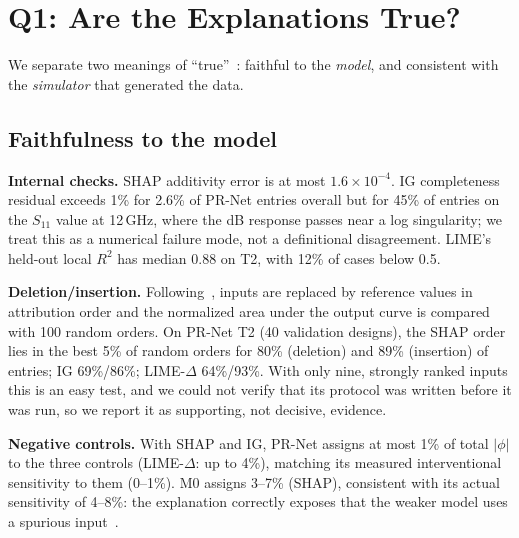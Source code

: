 \documentclass[conference,onecolumn,10pt]{IEEEtran}
\newcommand{\lime}{LIME-$\Delta$}
\begin{document}
\section{Q1: Are the Explanations True?}
We separate two meanings of ``true''~\cite{jacovi2020}: faithful to the \emph{model}, and consistent with the \emph{simulator} that generated the data.

\subsection{Faithfulness to the model}
\label{sec:q1model}
\textbf{Internal checks.} SHAP additivity error is at most $1.6\times10^{-4}$.
IG completeness residual exceeds 1\% for 2.6\% of PR-Net entries overall but for 45\% of entries on the $S_{11}$ value at 12\,GHz, where the dB response passes near a log singularity; we treat this as a numerical failure mode, not a definitional disagreement.
LIME's held-out local $R^2$ has median 0.88 on T2, with 12\% of cases below 0.5.

\textbf{Deletion/insertion.} Following~\cite{petsiuk2018}, inputs are replaced by reference values in attribution order and the normalized area under the output curve is compared with 100 random orders.
On PR-Net T2 (40 validation designs), the SHAP order lies in the best 5\% of random orders for 80\% (deletion) and 89\% (insertion) of entries; IG 69\%/86\%; \lime{} 64\%/93\%.
With only nine, strongly ranked inputs this is an easy test, and we could not verify that its protocol was written before it was run, so we report it as supporting, not decisive, evidence.

\textbf{Negative controls.} With SHAP and IG, PR-Net assigns at most 1\% of total $|\phi|$ to the three controls (\lime: up to 4\%), matching its measured interventional sensitivity to them (0--1\%).
M0 assigns 3--7\% (SHAP), consistent with its actual sensitivity of 4--8\%: the explanation correctly exposes that the weaker model uses a spurious input~\cite{adebayo2018}.
\end{document}
